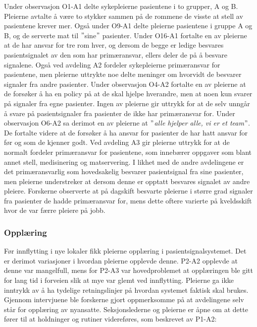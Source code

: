 \noindent
Under observasjon O1-A1 delte sykepleierne pasientene i to grupper, A og B. Pleierne avtalte å være to stykker sammen på de rommene de visste at stell av pasientene krever mer. Også under O9-A1 delte pleierne pasientene i gruppe A og B, og de serverte mat til $"$sine$"$ pasienter. Under O16-A1 fortalte en av pleierne at de har ansvar for tre rom hver, og dersom de begge er ledige besvares pasientsignalet av den som har primæransvar, ellers deler de på å besvare signalene. Også ved avdeling A2 fordeler sykepleierne primæransvar for pasientene, men pleierne uttrykte noe delte meninger om hvorvidt de besvarer signaler fra andre pasienter. Under observasjon O4-A2 fortalte en av pleierne at de forsøker å ha en policy på at de skal hjelpe hverandre, men at noen kun svarer på signaler fra egne pasienter. Ingen av pleierne gir uttrykk for at de selv unngår å svare på pasientsignaler fra pasienter de ikke har primæransvar for. Under observasjon O6-A2 sa derimot en av pleierne at \textit{$"$alle hjelper alle, vi er et team$"$}. De fortalte videre at de forsøker å ha ansvar for pasienter de har hatt ansvar for før og som de kjenner godt. Ved avdeling A3 gir pleierne uttrykk for at de normalt fordeler primæransvar for pasientene, som innebærer oppgaver som blant annet stell, medisinering og matservering. I likhet med de andre avdelingene er det primæransvarlig som hovedsakelig besvarer pasientsignal fra sine pasienter, men pleierne understreker at dersom denne er opptatt besvares signalet av andre pleiere. Forskerne observerte at på dagskift besvarte pleierne i større grad signaler fra pasienter de hadde primæransvar for, mens dette oftere varierte på kveldsskift hvor de var færre pleiere på jobb.  

\subsubsection{Opplæring}
Før innflytting i nye lokaler fikk pleierne opplæring i pasientsignalsystemet. Det er derimot variasjoner i hvordan pleierne opplevde denne. P2-A2 opplevde at denne var mangelfull, mens for P2-A3 var hovedproblemet at opplæringen ble gitt for lang tid i forveien slik at mye var glemt ved innflytting. Pleierne ga ikke inntrykk av å ha tydelige retningslinjer på hvordan systemet faktisk skal brukes. Gjennom intervjuene ble forskerne gjort oppmerksomme på at avdelingene selv står for opplæring av nyansatte. Seksjonslederne og pleierne er åpne om at dette fører til at holdninger og rutiner videreføres, som beskrevet av P1-A2:


